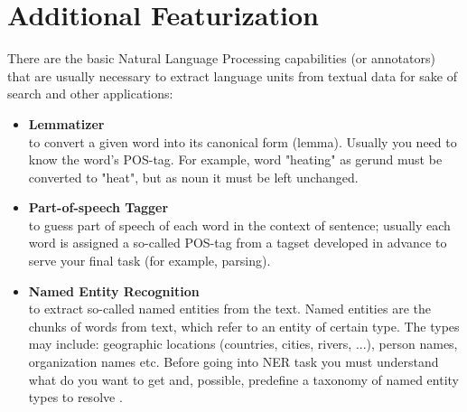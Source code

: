 \section{Additional Featurization}
There are the basic Natural Language Processing capabilities (or annotators) that are usually necessary to extract language units from textual data for sake of search and other applications:
\begin{itemize}
    \item \textbf{Lemmatizer}\\ \label{lemma}to convert a given word into its canonical form (lemma). Usually you need to know the word's POS-tag. For example, word "heating" as gerund must be converted to "heat", but as noun it must be left unchanged.
    \item \textbf{Part-of-speech Tagger}\\ \label{POS} to guess part of speech of each word in the context of sentence; usually each word is assigned a so-called POS-tag from a tagset developed in advance to serve your final task (for example, parsing).
    \item \textbf{Named Entity Recognition}\\ \label{NER}to extract so-called named entities from the text. Named entities are the chunks of words from text, which refer to an entity of certain type. The types may include: geographic locations (countries, cities, rivers, ...), person names, organization names etc. Before going into NER task you must understand what do you want to get and, possible, predefine a taxonomy of named entity types to resolve \cite{web037}.
\end{itemize}
